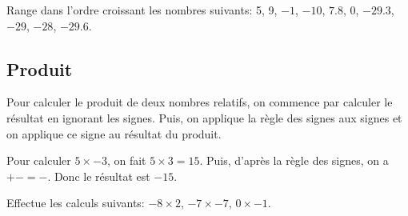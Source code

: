 \begin{exercicefr}
	Range dans l'ordre croissant les nombres suivants: 5, 9, $-1$, $-10$, $7.8$, 0, $-29.3$, $-29$, $-28$, $-29.6$.
\end{exercicefr}

\subsection{Produit}

\begin{propriete}
	Pour calculer le produit de deux nombres relatifs, on commence par calculer le résultat en ignorant les signes. Puis, on applique la règle des signes aux signes et on applique ce signe au résultat du produit.
\end{propriete}

\begin{exemple}
	Pour calculer $5 \times -3$, on fait $5 \times 3 = 15$. Puis, d'après la règle des signes, on a $+ - = -$. Donc le résultat est $-15$.
\end{exemple}

\begin{exercicefr}
	Effectue les calculs suivants: $-8 \times 2$, $-7 \times -7$, $0 \times -1$.
\end{exercicefr}